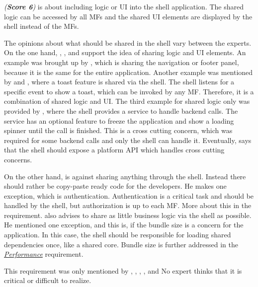 \textit{ (\textbf{Score 6})} is about including logic or \ac{UI} into the shell application.
The shared logic can be accessed by all \acp{MF} and the shared \ac{UI} elements are displayed by the shell instead of the \acp{MF}.

The opinions about what should be shared in the shell vary between the experts.
On the one hand, \textciteRehm{}, \textciteOlleck{}, \textcite{Grijzen.2019} and \textcite{Dornenburg.2019} support the idea of sharing logic and \ac{UI} elements.
An example was brought up by  \textciteSteyer{}, which is sharing the navigation or footer panel, because it is the same for the entire application.
Another example was mentioned by \citeauthorRehm{} and \citeauthor{Dornenburg.2019}, where a toast feature is shared via the shell.
The shell listens for a specific event to show a toast, which can be invoked by any \ac{MF}.
Therefore, it is a combination of shared logic and \ac{UI}.
The third example for shared logic only was provided by \citeauthorOlleck{}, where the shell provides a service to handle backend calls.
The service has an optional feature to freeze the application and show a loading spinner until the call is finished.
This is a cross cutting concern, which was required for some backend calls and only the shell can handle it.
Eventually, \citeauthor{Grijzen.2019} says that the shell should expose a platform \ac{API} which handles cross cutting concerns.

On the other hand, \textcite{Laug.2018} is against sharing anything through the shell.
Instead there should rather be copy-paste ready code for the developers.
He makes one exception, which is authentication.
Authentication is a critical task and should be handled by the shell, but authorization is up to each \ac{MF}.
More about this in the \textit{} requirement.
\textciteSteyer{} also advises to share as little business logic via the shell as possible.
He mentioned one exception, and this is, if the bundle size is a concern for the application.
In this case, the shell should be responsible for loading shared dependencies once, like a shared core.
Bundle size is further addressed in the \textit{\hyperref[cha:requirement_detail_performance]{Performance}} requirement.

This requirement was only mentioned by \textciteRehm{}, \textciteSteyer{}, \textciteOlleck{}, \textcite{Dornenburg.2019}, \textcite{Laug.2018} and \textcite{Grijzen.2019}
No expert thinks that it is critical or difficult to realize.



